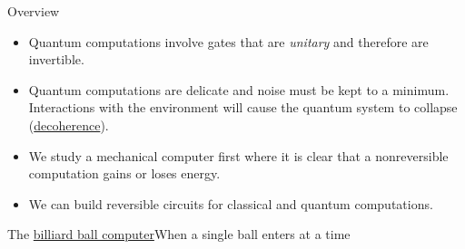 
\begin{frame}{Overview}
\begin{itemize}
    \item Quantum computations involve gates that are \emph{unitary} and therefore are invertible.
    \item Quantum computations are delicate and noise must be kept to a minimum.  Interactions with the environment will cause the quantum system to collapse (\href{https://en.wikipedia.org/wiki/Quantum_decoherence}{decoherence}).
    \item We study a mechanical computer first where it is clear that a nonreversible computation gains or loses energy.
    \item We can build reversible circuits for classical and quantum computations.
    
\end{itemize}
\end{frame}



\begin{frame}{The \href{https://en.wikipedia.org/wiki/Billiard-ball_computer}{billiard ball computer}}{When a single ball enters at a time}
    
\end{frame}

